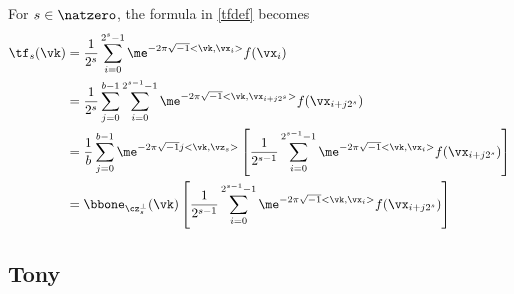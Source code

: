 \documentclass[]{elsarticle}
\theoremstyle{definition}
\theoremstyle{remark}
\begin{document}
For $s \in \natzero$, the formula in \eqref{tfdef} becomes
\begin{align*}
\tf_s(\vk) &= \frac{1}{2^s} \sum_{i=0}^{2^s-1} \me^{-2 \pi \sqrt{-1} <\vk , \vx_i>} f(\vx_i)\\
&= \frac{1}{2^s} \sum_{j=0}^{b-1} \sum_{i=0}^{2^{s-1}-1} \me^{-2 \pi \sqrt{-1} <\vk , \vx_{i+j2^s}>} f(\vx_{i+j2^s}) \\
&= \frac{1}{b} \sum_{j=0}^{b-1} \me^{-2 \pi \sqrt{-1} j <\vk , \vz_{s}>} \left[ \frac{1}{2^{s-1}}\sum_{i=0}^{2^{s-1}-1} \me^{-2 \pi \sqrt{-1} <\vk ,\vx_{i}>} f(\vx_{i+j2^s}) \right] \\
&= \bbone_{\cz_s^{\perp}}(\vk) \left[ \frac{1}{2^{s-1}}\sum_{i=0}^{2^{s-1}-1} \me^{-2 \pi \sqrt{-1} <\vk , \vx_{i}>} f(\vx_{i+j2^s}) \right] \\
\end{align*}

\subsection{Tony}
\end{document}
